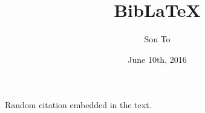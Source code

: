 \documentclass[a4paper,11pt]{article}
\author{Son To}
\date{June 10th, 2016}
\title{Bib\LaTeX}
\begin{document}
\maketitle

Random citation \autocite[1]{DUMMY:1} %
embedded in the text.
\newpage

\printbibliography %
\end{document}
